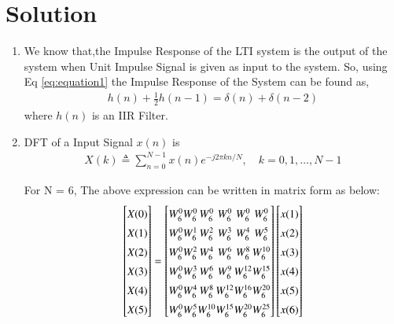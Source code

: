 \documentclass[journal,12pt,twocolumn]{IEEEtran}
\renewcommand\thesection{\arabic{section}}
\begin{document}
\section{Solution}
\begin{enumerate}[label=\thesection.\arabic*.,ref=\thesection.\theenumi]
\item
We know that,the Impulse Response of the LTI system is the output of the system when Unit Impulse Signal is given as input to the system.
\newline
So, using Eq \eqref{eq:equation1} the Impulse Response of the System can be found as,
\begin{align}
    h(n) + \frac{1}{2}h(n-1) = \delta(n) + \delta(n-2)	
\end{align}
where $h(n)$ is an IIR Filter.
\item DFT of a Input Signal $x(n)$ is 
\begin{align}
    X(k) \triangleq \sum_{n=0}^{N-1} x(n) e^{-j 2 \pi k n / N}, \quad k=0,1, \ldots, N-1
\end{align}

For N = 6, The above expression can be written in matrix form as below:
\begin{equation}
\renewcommand{\arraystretch}{1.45}
\setlength\arraycolsep{0.01pt}
\begin{bmatrix} 
X(0) \\ X(1) \\ X(2) \\ X(3) \\ X(4) \\ X(5) 
\end{bmatrix}
=
\begin{bmatrix}
W^{0}_{6} & W^{0}_{6} & W^{0}_{6} & W^{0}_{6} & W^{0}_{6} & W^{0}_{6}\\
W^{0}_{6} & W^{1}_{6} & W^{2}_{6} & W^{3}_{6} & W^{4}_{6} & W^{5}_{6}\\
W^{0}_{6} & W^{2}_{6} & W^{4}_{6} & W^{6}_{6} & W^{8}_{6} & W^{10}_{6}\\
W^{0}_{6} & W^{3}_{6} & W^{6}_{6} & W^{9}_{6} & W^{12}_{6} & W^{15}_{6}\\
W^{0}_{6} & W^{4}_{6} & W^{8}_{6} & W^{12}_{6} & W^{16}_{6} & W^{20}_{6}\\
W^{0}_{6} & W^{5}_{6} & W^{10}_{6} & W^{15}_{6} & W^{20}_{6} & W^{25}_{6} 
\end{bmatrix}
\begin{bmatrix}
x(1) \\ x(2) \\ x(3) \\ x(4) \\ x(5) \\x(6)
\end{bmatrix}
\end{equation}


\end{enumerate}
\end{document}
